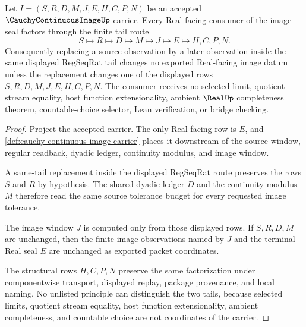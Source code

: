 \begin{theorem}
\label{thm:cauchy-continuous-image-tail-stability}
Let $I=(S,R,D,M,J,E,H,C,P,N)$ be an accepted $\CauchyContinuousImageUp$ carrier. Every Real-facing consumer of the image seal factors through the finite tail route
$$
S \longmapsto R \longmapsto D \longmapsto M \longmapsto J \longmapsto E \longmapsto H,C,P,N .
$$
Consequently replacing a source observation by a later observation inside the same displayed RegSeqRat tail changes no exported Real-facing image datum unless the replacement changes one of the displayed rows $S,R,D,M,J,E,H,C,P,N$. The consumer receives no selected limit, quotient stream equality, host function extensionality, ambient $\RealUp$ completeness theorem, countable-choice selector, Lean verification, or bridge checking.
\end{theorem}
\begin{proof}
Project the accepted carrier. The only Real-facing row is $E$, and \autoref{def:cauchy-continuous-image-carrier} places it downstream of the source window, regular readback, dyadic ledger, continuity modulus, and image window.

A same-tail replacement inside the displayed RegSeqRat route preserves the rows $S$ and $R$ by hypothesis. The shared dyadic ledger $D$ and the continuity modulus $M$ therefore read the same source tolerance budget for every requested image tolerance.

The image window $J$ is computed only from those displayed rows. If $S,R,D,M$ are unchanged, then the finite image observations named by $J$ and the terminal Real seal $E$ are unchanged as exported packet coordinates.

The structural rows $H,C,P,N$ preserve the same factorization under componentwise transport, displayed replay, package provenance, and local naming. No unlisted principle can distinguish the two tails, because selected limits, quotient stream equality, host function extensionality, ambient completeness, and countable choice are not coordinates of the carrier.
\end{proof}


